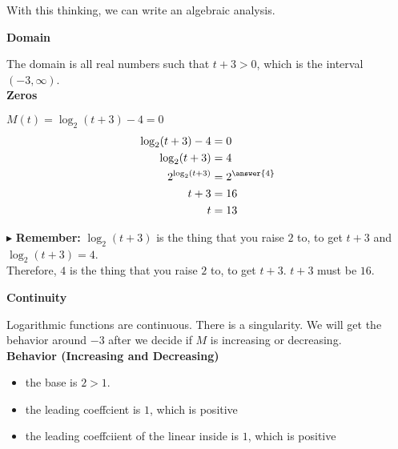 \documentclass{ximera}
\begin{document}
\begin{example}
\begin{idea}
\begin{image}
\end{image}



With this thinking, we can write an algebraic analysis. \\


\end{idea}





\textbf{Domain}

The domain is all real numbers such that $t + 3 > 0$, which is the interval $(-3, \infty)$.\\



\textbf{Zeros}


$M(t) = \log_2(t+3) - 4 = 0$ \\


\begin{align*}
\log_2(t+3) - 4 & = 0 \\
\log_2(t+3) & = 4 \\
2^{\log_2(t+3)} & = 2^{\answer{4}} \\
t+3 & = 16 \\
t & = 13
\end{align*}


$\blacktriangleright$ \textbf{Remember:} $\log_2(t+3)$ is the thing that you raise $2$ to, to get $t+3$ and $\log_2(t+3) = 4$.  \\

Therefore, $4$ is the thing that you raise $2$ to, to get $t+3$. $t+3$ must be $16$.




\textbf{Continuity}

Logarithmic functions are continuous. There is a singularity.  We will get the behavior around $-3$ after we decide if $M$ is increasing or decreasing.\\





\textbf{Behavior (Increasing and Decreasing)}


\begin{itemize}
  \item the base is $2 > 1$.
  \item the leading coeffcient is $1$, which is positive
  \item the leading coeffciient of the linear inside is $1$, which is positive
\end{itemize}



\end{example}
\end{document}
